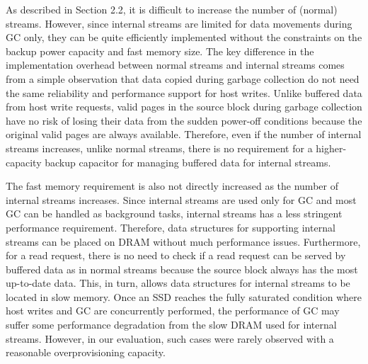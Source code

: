 {\color{blue}
As described in Section 2.2, it is difficult to increase the number of 
(normal) streams.  However, since internal streams are limited for 
data movements during GC only, they can be quite efficiently
implemented without the constraints on the backup power capacity and fast memory size.  
The key difference in the implementation overhead between normal streams and 
internal streams comes from a simple observation that data copied during 
garbage collection do not need the same reliability and performance support for host writes.  
Unlike buffered data from host write requests, valid pages in
the source block during garbage collection have no risk of losing their data 
from the sudden power-off conditions because the original valid pages are always available.    
Therefore, even if the
number of internal streams increases, unlike normal streams, there is no requirement 
for a higher-capacity backup capacitor for managing buffered data for internal streams. 

The fast memory requirement is also not directly increased as the number 
of internal streams increases.   
Since internal streams are used only for GC and most GC can be handled as background tasks,
internal streams has a less stringent performance requirement.  
Therefore, data structures for supporting internal streams can be placed 
on DRAM without much performance issues.  
Furthermore, for a read request, there is no need to check if a read request 
can be served by buffered data as in normal streams because the source block always 
has the most up-to-date data.  
This, in turn, allows data structures for internal streams to be located in slow memory.
Once an SSD reaches the fully saturated condition where host writes and GC 
are concurrently performed, the performance of GC may suffer some performance degradation 
from the slow DRAM used for internal streams.   
However, in our evaluation, such cases were rarely observed with a reasonable overprovisioning capacity.
}

